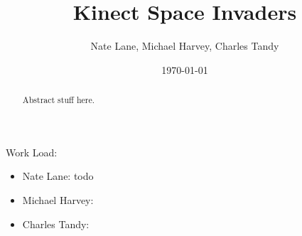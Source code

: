 \documentclass[12pt,conference]{IEEEtran}
\title{Kinect Space Invaders}
\date{\today}
\author{Nate Lane, Michael Harvey, Charles Tandy}
\begin{document}
\maketitle
\thispagestyle{plain}
\pagestyle{plain}
\begin{abstract}
\indent
Abstract stuff here.
\end{abstract}




\appendix
Work Load:
\begin{itemize}
\item Nate Lane: todo
\item Michael Harvey:
\item Charles Tandy: 
\end{itemize}
\end{document}
